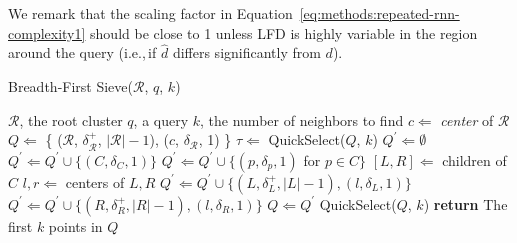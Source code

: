 We remark that the scaling factor in Equation~\ref{eq:methods:repeated-rnn-complexity1} should be close to 1 unless LFD is highly variable in the region around the query (i.e.,\,if $\hat{d}$ differs significantly from $d$).

\begin{minipage}{0.5125\textwidth}
    \begin{algorithm}[H]\small
        \caption{Breadth-First Sieve($\mathcal{R}$, $q$, $k$)} %
        \label{alg:methods:bredth-first-sieve} %
        \begin{algorithmic} %
            \Require $\mathcal{R}$, the root cluster
            \Require $q$, a query
            \Require $k$, the number of neighbors to find
            \State $c \Leftarrow$ \textit{center} of $\mathcal{R}$
            \State $Q \Leftarrow$ \{ ($\mathcal{R}$, $\delta^{+}_{\mathcal{R}}$, $|\mathcal{R}| - 1$), ($c$, $\delta_{\mathcal{R}}$, 1) \}
                \State $\tau \Leftarrow$ QuickSelect($Q$, $k$)
                \State $Q^{'} \Leftarrow \emptyset$
                            \State $Q^{'} \Leftarrow Q^{'} \cup \{ (C, \delta_{C}, 1) \}$
                            \State $Q^{'} \Leftarrow Q^{'} \cup \{ (p, \delta_{p}, 1)$ for $p \in C \}$
                        \Else
                            \State $[L, R] \Leftarrow$ children of $C$
                            \State $l, r \Leftarrow$ centers of $L, R$
                            \State $Q^{'} \Leftarrow Q^{'} \cup \{ (L, \delta^{+}_{L}, |L| - 1), (l, \delta_{L}, 1) \}$
                            \State $Q^{'} \Leftarrow Q^{'} \cup \{ (R, \delta^{+}_{R}, |R| - 1), (l, \delta_{R}, 1) \}$
                        \EndIf
                    \EndIf
                \EndFor
                \State $Q \Leftarrow Q^{'}$
            \EndWhile
            \State QuickSelect($Q$, $k$)
            \State \textbf{return} The first $k$ points in $Q$
        \end{algorithmic}
    \end{algorithm}
\end{minipage}
\hfill

